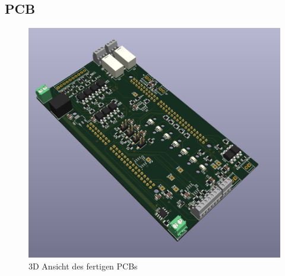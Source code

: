 \subsection{\ac{PCB}}
\begin{figure}[H]
	\centering
	\includegraphics[width=1.0\textwidth]{images/Hardware/Platine_Fertig_3D_ansicht(1).PNG}
	\caption{3D Ansicht des fertigen PCBs}
	\label{fig:PCB_3D}
\end{figure}
